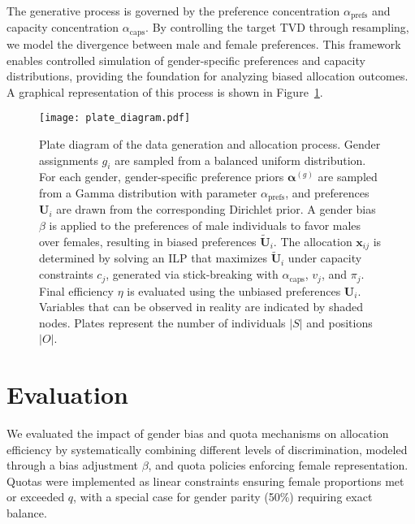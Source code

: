 \documentclass[letterpaper]{article}
\begin{document}
The generative process is governed by the preference concentration \( \alpha_\mathrm{prefs} \) and capacity concentration \( \alpha_\mathrm{caps} \). By controlling the target TVD through resampling, we model the divergence between male and female preferences. This framework enables controlled simulation of gender-specific preferences and capacity distributions, providing the foundation for analyzing biased allocation outcomes. A graphical representation of this process is shown in Figure~\ref{fig:plate_diagram}.



\begin{figure}[ht]

  \centering
  \texttt{[image: plate\_diagram.pdf]}
\caption{Plate diagram of the data generation and allocation process. Gender assignments \( g_i \) are sampled from a balanced uniform distribution. For each gender, gender-specific preference priors \( \mathbf{\alpha}^{(g)} \) are sampled from a Gamma distribution with parameter \( \alpha_\mathrm{prefs} \), and preferences \( \mathbf{U}_i \) are drawn from the corresponding Dirichlet prior. A gender bias \( \beta \) is applied to the preferences of male individuals to favor males over females, resulting in biased preferences \( \tilde{\mathbf{U}}_i \). The allocation \( \mathbf{x}_{ij} \) is determined by solving an ILP that maximizes \( \tilde{\mathbf{U}}_i \) under capacity constraints \( c_j \), generated via stick-breaking with \( \alpha_\mathrm{caps} \), \( v_j \), and \( \pi_j \). Final efficiency \( \eta \) is evaluated using the unbiased preferences \( \mathbf{U}_i \). Variables that can be observed in reality are indicated by shaded nodes. Plates represent the number of individuals \( |S| \) and positions \( |O| \).}

  \label{fig:plate_diagram}
\end{figure}

\section{Evaluation}

We evaluated the impact of gender bias and quota mechanisms on allocation efficiency by systematically combining different levels of discrimination, modeled through a bias adjustment \( \beta \), and quota policies enforcing female representation. Quotas were implemented as linear constraints ensuring female proportions met or exceeded \( q \), with a special case for gender parity (50\%) requiring exact balance.
\end{document}
